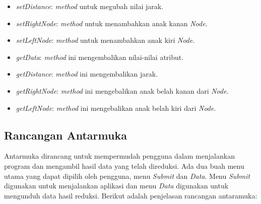\begin{itemize}
\begin{itemize}
\item \textit{setDistance}: \textit{method} untuk megubah nilai jarak.

\item \textit{setRightNode}: \textit{method} untuk menambahkan anak kanan \textit{Node}.

\item \textit{setLeftNode}: \textit{method} untuk menambahkan anak kiri \textit{Node}.

\item \textit{getData}: \textit{method} ini mengembalikan nilai-nilai atribut.

\item \textit{getDistance}: \textit{method} ini mengembalikan jarak.

\item \textit{getRightNode}: \textit{method} ini mengebalikan anak belah kanan dari \textit{Node}.

\item \textit{getLeftNode}: \textit{method} ini mengebalikan anak belah kiri dari \textit{Node}.

\end{itemize}


\end{itemize}


\subsection{Rancangan Antarmuka}

Antarmuka dirancang untuk mempermudah pengguna dalam menjalankan program dan mengambil hasil data yang telah direduksi. Ada dua buah menu utama yang dapat dipilih oleh pengguna, menu \textit{Submit} dan \textit{Data}. Menu \textit{Submit} digunakan untuk menjalankan aplikasi dan menu \textit{Data} digunakan untuk mengunduh data hasil reduksi. Berikut adalah penjelasan rancangan antaramuka:

